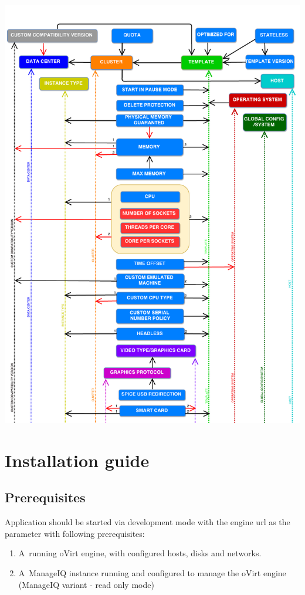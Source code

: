 \includegraphics[page=3, width=1.00\textwidth, angle=0]{DependencyGraph}

\chapter{Installation guide} \label{install}

\section{Prerequisites}
Application should be started via development mode with the engine url as the parameter with following prerequisites: 

\begin{enumerate}
\item A~running oVirt engine, with configured hosts, disks and networks.  
\item A~ManageIQ instance running and configured to manage the oVirt engine (ManageIQ variant - read only mode)
\end{enumerate} 

